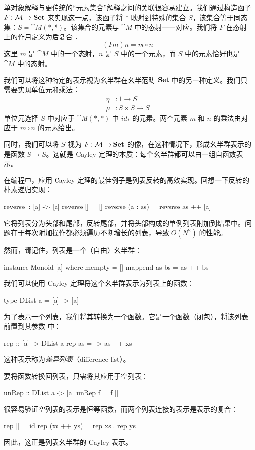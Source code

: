 \documentclass[DaoFP]{subfiles}
\begin{document}
单对象解释与更传统的“元素集合”解释之间的关联很容易建立。我们通过构造函子 $F \colon \mathcal{M} \to \mathbf{Set}$ 来实现这一点，该函子将 $*$ 映射到特殊的集合 $S$，该集合等于同态集：$S = \cat M(*, *)$。该集合的元素与 $\cat M$ 中的态射一一对应。我们将 $F$ 在态射上的作用定义为后复合：
\[ (F m) n = m \circ n \]
这里 $m$ 是 $\cat M$ 中的一个态射，$n$ 是 $S$ 中的一个元素，而 $S$ 中的元素恰好也是 $\cat M$ 中的态射。

我们可以将这种特定的表示视为幺半群在幺半范畴 $\mathbf{Set}$ 中的另一种定义。我们只需要实现单位元和乘法：
\begin{align*}
\eta &\colon 1 \to S
\\
\mu &\colon S \times S \to S
\end{align*}
单位元选择 $S$ 中对应于 $\cat M(*, *)$ 中 $id_*$ 的元素。两个元素 $m$ 和 $n$ 的乘法由对应于 $m \circ n$ 的元素给出。

同时，我们可以将 $S$ 视为 $F \colon \mathcal{M} \to \mathbf{Set}$ 的像，在这种情况下，形成幺半群表示的是函数 $S \to S$。这就是 Cayley 定理的本质：每个幺半群都可以由一组自函数表示。

在编程中，应用 Cayley 定理的最佳例子是列表反转的高效实现。回想一下反转的朴素递归实现：
\begin{haskell}
reverse :: [a] -> [a]
reverse [] = []
reverse (a : as) = reverse as ++ [a]
\end{haskell}
它将列表分为头部和尾部，反转尾部，并将头部构成的单例列表附加到结果中。问题在于每次附加操作都必须遍历不断增长的列表，导致 $O(N^2)$ 的性能。

然而，请记住，列表是一个（自由）幺半群：
\begin{haskell}
instance Monoid [a] where
  mempty = []
  mappend as bs = as ++ bs
\end{haskell}
我们可以使用 Cayley 定理将这个幺半群表示为列表上的函数：
\begin{haskell}
type DList a = [a] -> [a]
\end{haskell}
为了表示一个列表，我们将其转换为一个函数。它是一个函数（闭包），将该列表  前置到其参数  中：
\begin{haskell}
rep :: [a] -> DList a
rep as = \xs -> as ++ xs
\end{haskell}
这种表示称为\emph{差异列表}（difference list）。

要将函数转换回列表，只需将其应用于空列表：
\begin{haskell}
unRep :: DList a -> [a]
unRep f = f []
\end{haskell}
很容易验证空列表的表示是恒等函数，而两个列表连接的表示是表示的复合：
\begin{haskell}
rep [] = id
rep (xs ++ ys) = rep xs . rep ys
\end{haskell}
因此，这正是列表幺半群的 Cayley 表示。
\end{document}
